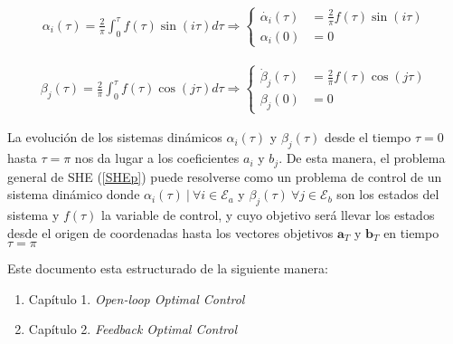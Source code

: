 \begin{gather}
    \alpha_i(\tau) = \frac{2}{\pi}\int_0^\tau f(\tau) \sin(i\tau)d\tau 
    \Rightarrow
    \begin{cases} \label{ode}
        \dot{\alpha_i}(\tau) & = \frac{2}{\pi}f(\tau)\sin(i\tau) \\  
        \alpha_i(0) & = 0       
    \end{cases}
\end{gather}

\begin{gather}
    \beta_j(\tau) = \frac{2}{\pi}\int_0^\tau f(\tau) \cos(j\tau)d\tau 
    \Rightarrow
    \begin{cases} \label{ode}
        \dot{\beta}_j(\tau) & = \frac{2}{\pi}f(\tau)\cos(j\tau) \\  
        \beta_j(0) & = 0       
    \end{cases}
\end{gather}

La evolución de los sistemas dinámicos $\alpha_i(\tau)$ y $\beta_j(\tau)$ desde el tiempo $\tau=0$ hasta $\tau=\pi$ nos da lugar a los coeficientes $a_i$ y $b_j$. 
De esta manera, el problema general de SHE (\ref{SHEp}) puede resolverse como un problema de control de un sistema dinámico donde $\alpha_i(\tau) \ | \ \forall i \in \mathcal{E}_a  $ y $ \beta_j(\tau) \ \forall j \in \mathcal{E}_b$ son los estados del sistema y $f(\tau)$ la variable de control, y cuyo objetivo será llevar los estados desde el origen de coordenadas hasta los vectores objetivos $\bm{a}_T$ y $\bm{b}_T$ en tiempo $\tau = \pi$
\newline

Este documento esta estructurado de la siguiente manera: 
\begin{enumerate}
    \item Capítulo 1. \emph{Open-loop Optimal Control}
    \item Capítulo 2. \emph{Feedback Optimal Control}
\end{enumerate}